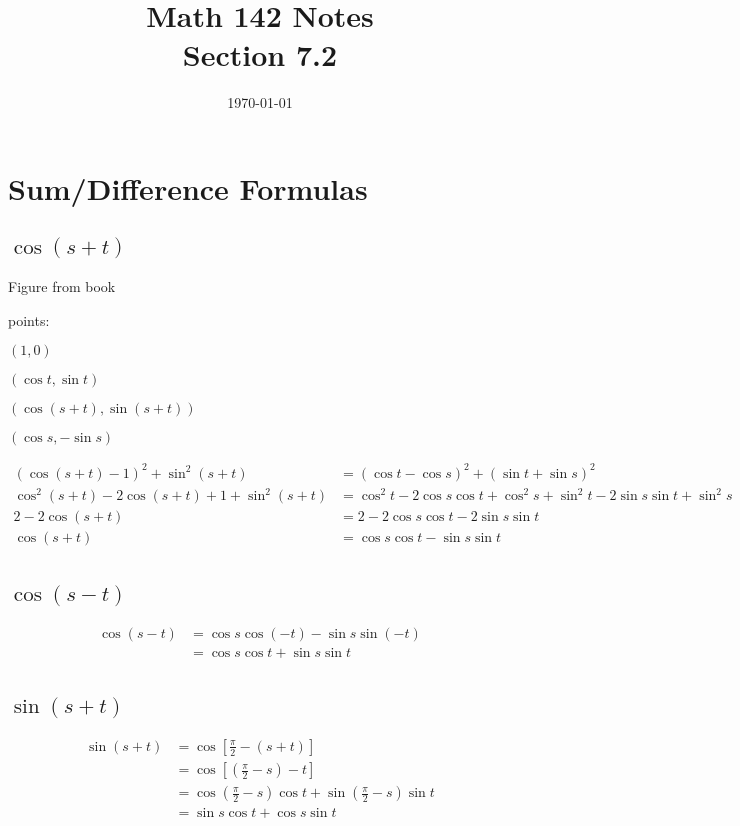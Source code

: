 \documentclass{exam}
\title{Math 142 Notes \\ Section 7.2}
\date{\today}
\begin{document}
  \maketitle
  \tableofcontents

  \section{Sum/Difference Formulas}

  \subsection{$\cos(s + t)$}
  Figure from book

  points:
  \begin{itemize*}
    \item $(1, 0)$
    \item $(\cos t, \sin t)$
    \item $(\cos (s + t), \sin (s + t))$
    \item $(\cos s, - \sin s)$
  \end{itemize*}

  \begin{align*}
    (\cos(s + t) - 1)^2 + \sin^2(s + t)               & = (\cos t - \cos s)^2 + (\sin t + \sin s)^2 \\
    \cos^2(s + t) - 2 \cos(s + t) + 1 + \sin^2(s + t) & = \cos^2 t - 2 \cos s \cos t + \cos^2 s + \sin^2 t - 2 \sin s \sin t + \sin^2 s \\
    2 - 2 \cos(s + t)                                 & = 2 - 2 \cos s \cos t - 2 \sin s \sin t \\
    \cos(s + t)                                       & = \cos s \cos t - \sin s \sin t \\
  \end{align*}

  \subsection{$\cos(s - t)$}
  \begin{align*}
    \cos(s - t) & = \cos s \cos (-t) - \sin s \sin (-t) \\
                & = \cos s \cos t + \sin s \sin t \\
  \end{align*}

  \subsection{$\sin(s + t)$}
  \begin{align*}
    \sin(s + t) & = \cos \left[ \frac{\pi}{2} - (s + t) \right] \\
                & = \cos \left[ \left(\frac{\pi}{2} - s \right) - t \right] \\
                & = \cos \left( \frac{\pi}{2} - s \right) \cos t + \sin \left( \frac{\pi}{2} - s \right) \sin t \\
                & = \sin s \cos t + \cos s \sin t \\
  \end{align*}
\end{document}
